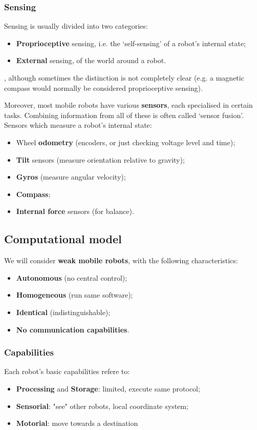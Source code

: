 \subsubsection{Sensing}
Sensing is usually divided into two categories:
\begin{itemize}
    \item \textbf{Proprioceptive} sensing, i.e. the ‘self-sensing’ of a robot’s internal state;
    \item \textbf{External} sensing, of the world around a robot.
\end{itemize}
, although sometimes the distinction is not completely clear (e.g. a magnetic compass would normally be considered proprioceptive sensing).

Moreover, most mobile robots have various \textbf{sensors}, each specialised in certain tasks. Combining information from all of these is often called ‘sensor fusion’. Sensors which measure a robot’s internal state:
\begin{itemize}
    \item Wheel \textbf{odometry} (encoders, or just checking voltage level and time);
    \item \textbf{Tilt} sensors (measure orientation relative to gravity);
    \item \textbf{Gyros} (measure angular velocity);
    \item \textbf{Compass};
    \item \textbf{Internal force} sensors (for balance).
\end{itemize}

\subsection{Computational model}
We will consider \textbf{weak mobile robots}, with the following characteristics:
\begin{itemize}
    \item \textbf{Autonomous} (no central control);
    \item \textbf{Homogeneous} (run same software);
    \item \textbf{Identical} (indistinguishable);
    \item \textbf{No communication capabilities}.
\end{itemize}

\subsubsection{Capabilities}
Each robot's basic capabilities refere to:
\begin{itemize}
    \item \textbf{Processing} and \textbf{Storage}: limited, execute same protocol;
    \item \textbf{Sensorial}: "see" other robots, local coordinate system;
    \item \textbf{Motorial}: move towards a destination
\end{itemize}

